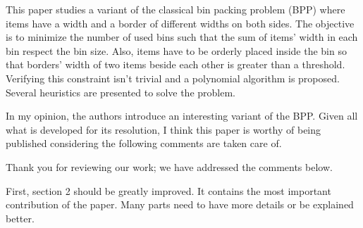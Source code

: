 \documentclass[a4paper,11pt]{article}
\newcommand{\ahc}[1]{{\color{myBlue}#1}}
\newcommand{\note}[1]{{\color{myDarkBlue2}#1}}
\begin{document}
This paper studies a variant of the classical bin packing problem (BPP) where items have a width and a border of different widths on both sides. The objective is to minimize the number of used bins such that the sum of items' width in each bin respect the bin size. Also, items have to be orderly placed inside the bin so that borders' width of two items beside each other is greater than a threshold. Verifying this constraint isn't trivial and a polynomial algorithm is proposed. Several heuristics are presented to solve the problem.

In my opinion, the authors introduce an interesting variant of the BPP. Given all what is developed for its resolution, I think this paper is worthy of being published considering the following comments are taken care of. 

\note{Thank you for reviewing our work; we have addressed the comments below.}


First, section 2 should be greatly improved. It contains the most important contribution of the paper. Many parts need to have more details or be explained better. 

\end{document}
